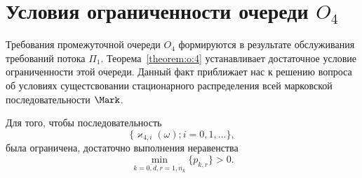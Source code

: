 \section{Условия ограниченности очереди $O_4$}
Требования промежуточной очереди $O_4$ формируются в результате обслуживания требований потока $\Pi_1$. Теорема~\ref{theorem:o:4} устанавливает достаточное условие ограниченности этой очереди. Данный факт приближает нас к решению вопроса об условиях сущестсвовании стационарного распределения всей марковской последовательности $\Mark$. 
\begin{theorem}
Для того,  чтобы последовательность 
$$
\{\varkappa_{4, i}(\omega); i =0,  1,  \ldots\}, 
$$ была ограничена,  достаточно выполнения неравенства
\begin{equation*}
    \min_{k=\overline{0, d},  r=\overline{1, n_k}} {\{p_{k, r}\}} > 0.
\end{equation*}
\label{theorem:o:4}
\end{theorem}
